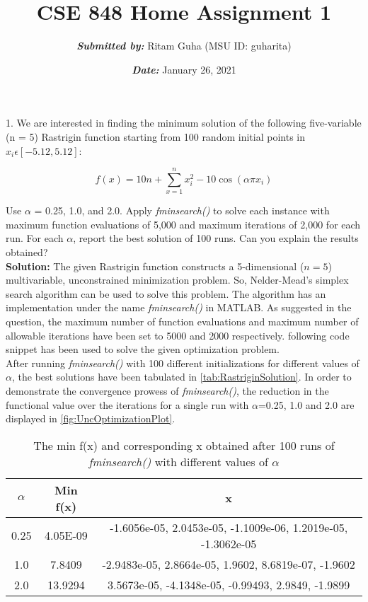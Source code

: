 \documentclass{article}
\title{\textbf{CSE 848 Home Assignment 1}}
\author{\textbf{\textit{Submitted by:}} Ritam Guha (MSU ID: guharita)}
\date{\textbf{\textit{Date:}} January 26, 2021}
\begin{document}
\maketitle

1. We are interested in finding the minimum solution of the following five-variable (n = 5) Rastrigin function starting from 100 random initial points in $x_{i} \epsilon[-5.12, 5.12]$:

\begin{equation*}
    f(x) = 10n + \sum_{x=1}^{n} {x_{i}^2 - 10\cos(\alpha \pi x_i) }
\end{equation*}

Use $\alpha$ = 0.25, 1.0, and 2.0. Apply \textit{fminsearch()} to solve each instance with maximum function evaluations of 5,000 and maximum iterations of 2,000 for each run. For each $\alpha$, report the best solution of 100 runs. Can you explain the results obtained?\\

\textbf{Solution:}
The given Rastrigin function constructs a 5-dimensional ($n=5$) multivariable, unconstrained minimization problem. So, Nelder-Mead's simplex search algorithm can be used to solve this problem. The algorithm has an implementation under the name \textit{fminsearch()} in MATLAB. As suggested in the question, the maximum number of function evaluations and maximum number of allowable iterations have been set to 5000 and 2000 respectively. following code snippet has been used to solve the given optimization problem.\\



After running \textit{fminsearch()} with 100 different initializations for different values of $\alpha$, the best solutions have been tabulated in \autoref{tab:RastriginSolution}. In order to demonstrate the convergence prowess of \textit{fminsearch()}, the reduction in the functional value over the iterations for a single run with $\alpha$=0.25, 1.0 and 2.0 are displayed in \autoref{fig:UncOptimizationPlot}.

\begin{table}[H]
    \centering
    \begin{tabular}{|c|c|c|}
    \hline
        \textbf{$\alpha$} & \textbf{Min f(x)} & \textbf{x} \\ \hline
        0.25 & 4.05E-09 & -1.6056e-05, 2.0453e-05, -1.1009e-06, 1.2019e-05, -1.3062e-05 \\ \hline
        1.0 & 7.8409 & -2.9483e-05, 2.8664e-05, 1.9602, 8.6819e-07, -1.9602 \\ \hline
        2.0 & 13.9294 & 3.5673e-05, -4.1348e-05, -0.99493, 2.9849, -1.9899 \\ \hline
    \end{tabular}
    \caption{The min f(x) and corresponding x obtained after 100 runs of \textit{fminsearch()} with different values of $\alpha$}
    \label{tab:RastriginSolution}
\end{table}
\end{document}
